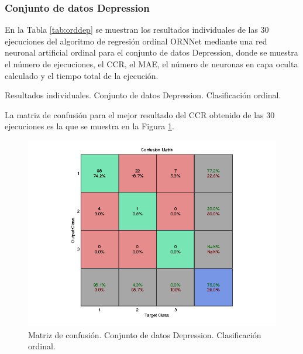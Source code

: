 			\subsubsection{Conjunto de datos Depression}
			
			En la Tabla \ref{tab:orddep} se muestran los resultados individuales de las 30 ejecuciones del algoritmo de regresión ordinal ORNNet mediante una red neuronal artificial ordinal para el conjunto de datos Depression, donde se muestra el número de ejecuciones, el CCR, el MAE, el número de neuronas en capa oculta calculado y el tiempo total de la ejecución.\\
			
			\begin{table}[!htbp]
				\centering
				\caption{Resultados individuales. Conjunto de datos Depression. Clasificación ordinal.}
				\label{tab:orddep}
			\end{table}
			
			La matriz de confusión para el mejor resultado del CCR obtenido de las 30 ejecuciones es la que se muestra en la Figura \ref{fig:orddep}.
			
			\begin{figure}[htbp]
				\centering
				\includegraphics[scale=0.8]{../src/results/ordinal/depresion_mc1.png}
				\caption{Matriz de confusión. Conjunto de datos Depression. Clasificación ordinal.}
				\label{fig:orddep}
			\end{figure}
			

